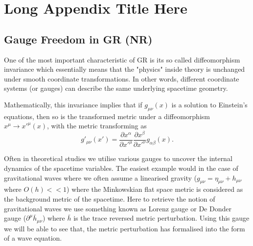 

\chapter{Long Appendix Title Here} %

\label{AppendixA} %


\section{Gauge Freedom in GR (NR)}

One of the most important characteristic of GR is its so called diffeomorphism invariance which essentially means
that the "physics" inside theory is unchanged under smooth coordinate transformations. In other words, different coordinate systems (or gauges) can describe the same underlying spacetime geometry.


Mathematically, this invariance implies that if $g_{\mu\nu}(x)$ is a solution to Einstein's equations, then so is the transformed metric under a diffeomorphism $x^\mu \rightarrow x'^\mu(x)$, with the metric transforming as
\begin{equation}
g'_{\mu\nu}(x') = \frac{\partial x^\alpha}{\partial x'^\mu} \frac{\partial x^\beta}{\partial x'^\nu} g_{\alpha\beta}(x).
\end{equation}

Often in theoretical studies we utilise various gauges to uncover the internal dynamics of the spacetime variables. The easiest example would in the case of gravitational waves where we often assume a linearised gravity ($g_{\mu\nu}= \eta_{\mu \nu} + h_{\mu \nu}$ where $O(h) << 1$) where the Minkowskian flat space metric is considered as the background metric of the spacetime.  Here to retrieve the notion of gravitational waves we use something known as Lorenz gauge or De Donder gauge ($\partial^{\mu} \bar{h}_{\mu\nu}$) where $\bar{h}$ is the trace reversed metric perturbation. 
Using this gauge we will be able to see that, the metric perturbation has formalised into the form of a wave equation.

